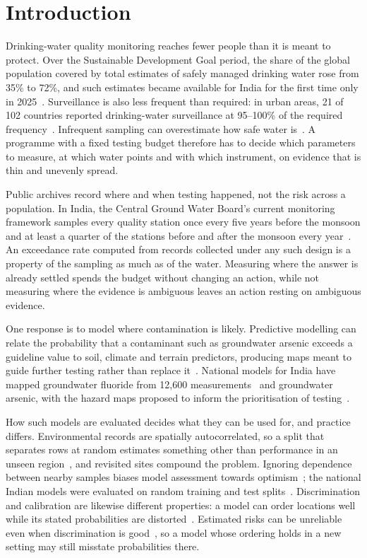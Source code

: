 \documentclass[10pt,letterpaper]{article}
\begin{document}
\clearpage
{}
\linenumbers

\section*{Introduction}

Drinking-water quality monitoring reaches fewer people than it is meant to protect. Over the Sustainable Development Goal period, the share of the global population covered by total estimates of safely managed drinking water rose from 35\% to 72\%, and such estimates became available for India for the first time only in 2025~\cite{JMP2025}. Surveillance is also less frequent than required: in urban areas, 21 of 102 countries reported drinking-water surveillance at 95--100\% of the required frequency~\cite{GLAAS2025}. Infrequent sampling can overestimate how safe water is~\cite{Bain2014}. A programme with a fixed testing budget therefore has to decide which parameters to measure, at which water points and with which instrument, on evidence that is thin and unevenly spread.

Public archives record where and when testing happened, not the risk across a population. In India, the Central Ground Water Board's current monitoring framework samples every quality station once every five years before the monsoon and at least a quarter of the stations before and after the monsoon every year~\cite{CGWB-SOP-GWQDataAnalysis}. An exceedance rate computed from records collected under any such design is a property of the sampling as much as of the water. Measuring where the answer is already settled spends the budget without changing an action, while not measuring where the evidence is ambiguous leaves an action resting on ambiguous evidence.

One response is to model where contamination is likely. Predictive modelling can relate the probability that a contaminant such as groundwater arsenic exceeds a guideline value to soil, climate and terrain predictors, producing maps meant to guide further testing rather than replace it~\cite{Podgorski2020}. National models for India have mapped groundwater fluoride from 12,600 measurements~\cite{Podgorski2018} and groundwater arsenic, with the hazard maps proposed to inform the prioritisation of testing~\cite{Podgorski2020-IJERPH-India}.

How such models are evaluated decides what they can be used for, and practice differs. Environmental records are spatially autocorrelated, so a split that separates rows at random estimates something other than performance in an unseen region~\cite{Meyer2019}, and revisited sites compound the problem. Ignoring dependence between nearby samples biases model assessment towards optimism~\cite{MeyerPebesma2022}; the national Indian models were evaluated on random training and test splits~\cite{Podgorski2018,Podgorski2020-IJERPH-India}. Discrimination and calibration are likewise different properties: a model can order locations well while its stated probabilities are distorted~\cite{NiculescuMizil2005}. Estimated risks can be unreliable even when discrimination is good~\cite{VanCalster2019}, so a model whose ordering holds in a new setting may still misstate probabilities there.
\end{document}
